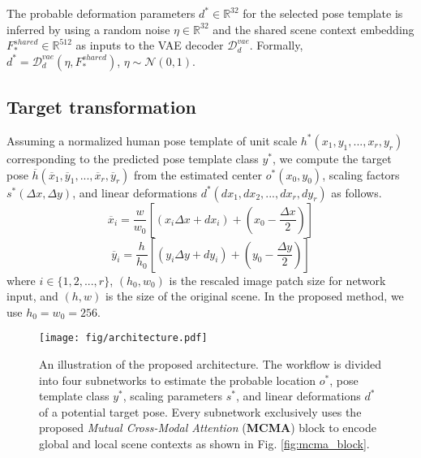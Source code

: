 The probable deformation parameters $d^* \in \mathbb{R}^{32}$ for the selected pose template is inferred by using a random noise $\eta \in \mathbb{R}^{32}$ and the shared scene context embedding $F^{shared}_* \in \mathbb{R}^{512}$ as inputs to the VAE decoder $\mathcal{D}^{vae}_d$. Formally, $d^* = \mathcal{D}^{vae}_d(\eta, F^{shared}_*)$, $\eta \sim \mathcal{N}(0, 1)$.

\subsection{Target transformation}
\label{sec:method_transformation}

Assuming a normalized human pose template of unit scale $h^*(x_1, y_1, ..., x_r, y_r)$ corresponding to the predicted pose template class $y^*$, we compute the target pose $\overline{h}(\overline{x}_1, \overline{y}_1, ..., \overline{x}_r, \overline{y}_r)$ from the estimated center $o^*(x_0, y_0)$, scaling factors $s^*(\Delta x, \Delta y)$, and linear deformations $d^*(dx_1, dx_2, ..., dx_r, dy_r)$ as follows.
\[
\overline{x}_i = \frac{w}{w_0} \left[ \left( x_i \Delta x + dx_i \right) + \left( x_0 - \frac{\Delta x}{2} \right) \right]
\]
\[
\overline{y}_i = \frac{h}{h_0} \left[ \left( y_i \Delta y + dy_i \right) + \left( y_0 - \frac{\Delta y}{2} \right) \right]
\]
where $i \in \{1, 2, ..., r\}$, $(h_0, w_0)$ is the rescaled image patch size for network input, and $(h, w)$ is the size of the original scene. In the proposed method, we use $h_0 = w_0 = 256$.

\begin{figure*}[t]
  \centering
  \texttt{[image: fig/architecture.pdf]}
  \caption{An illustration of the proposed architecture. The workflow is divided into four subnetworks to estimate the probable location $o^*$, pose template class $y^*$, scaling parameters $s^*$, and linear deformations $d^*$ of a potential target pose. Every subnetwork exclusively uses the proposed \emph{Mutual Cross-Modal Attention} (\textbf{MCMA}) block to encode global and local scene contexts as shown in Fig. \ref{fig:mcma_block}.}
  \label{fig:architecture}
\end{figure*}

